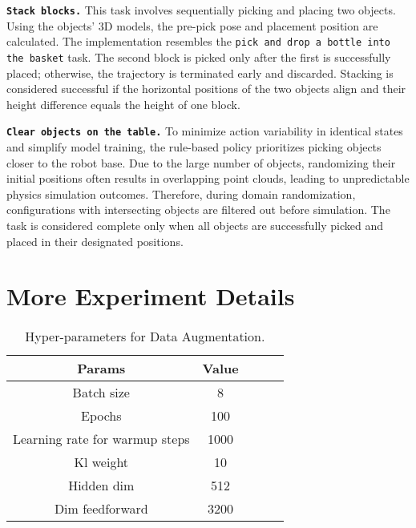 \noindent\textbf{\texttt{Stack blocks.}}
This task involves sequentially picking and placing two objects. Using the objects' 3D models, the pre-pick pose and placement position are calculated. The implementation resembles the \texttt{pick and drop a bottle into the basket} task. The second block is picked only after the first is successfully placed; otherwise, the trajectory is terminated early and discarded. Stacking is considered successful if the horizontal positions of the two objects align and their height difference equals the height of one block.

\noindent\textbf{\texttt{Clear objects on the table.}}
To minimize action variability in identical states and simplify model training, the rule-based policy prioritizes picking objects closer to the robot base. Due to the large number of objects, randomizing their initial positions often results in overlapping point clouds, leading to unpredictable physics simulation outcomes. Therefore, during domain randomization, configurations with intersecting objects are filtered out before simulation. The task is considered complete only when all objects are successfully picked and placed in their designated positions.

\section{More Experiment Details}
\label{sub:experiment_details}

\begin{table*}[b]
    \caption{Hyper-parameters for Data Augmentation.}
    \label{sub:tab:hyperparam}
    \centering
    \begin{tabular}{ccccc}
    \toprule
        Params & Value \\ \midrule
        Batch size & 8 \\
        Epochs & 100 \\
        Learning rate for warmup steps & 1000 \\ 
        Kl weight & 10 \\
        Hidden dim & 512 \\
        Dim feedforward & 3200 \\

        \bottomrule
    \end{tabular}
\end{table*}



